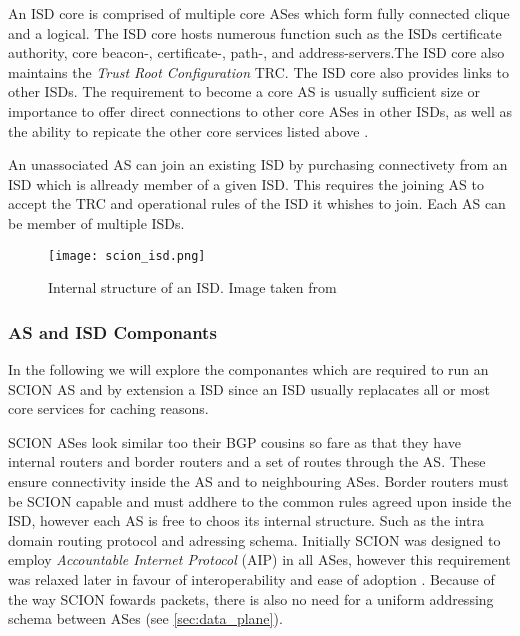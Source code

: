 \documentclass[../eva1_scion.tex]{subfiles}
\begin{document}
    An ISD core is comprised of multiple core ASes which form fully connected clique and a logical. The ISD core hosts numerous function such as the ISDs certificate authority, core beacon-, certificate-, path-, and address-servers.The ISD core also maintains the \textit{Trust Root Configuration} TRC. The ISD core also provides links to other ISDs. The requirement to become a core AS is usually sufficient size or importance to offer direct connections to other core ASes in other ISDs, as well as the ability to repicate the other core services listed above \cite{scion_2011}.

    An unassociated AS can join an existing ISD by purchasing connectivety from an ISD which is allready member of a given ISD. This requires the joining AS to accept the TRC and operational rules of the ISD it whishes to join. Each AS can be member of multiple ISDs.

    \begin{figure}[ht]
        \centering
        \texttt{[image: scion\_isd.png]}
        \caption{Internal structure of an ISD. Image taken from \cite{scion_2017}}%
        \label{fig:isd}
    \end{figure}

    \subsubsection{AS and ISD Componants}

    In the following we will explore the componantes which are required to run an SCION AS and by extension a ISD since an ISD usually replacates all or most core services for caching reasons.

    SCION ASes look similar too their BGP cousins so fare as that they have internal routers and border routers and a set of routes through the AS. These ensure connectivity inside the AS and to neighbouring ASes. Border routers must be SCION capable and must addhere to the common rules agreed upon inside the ISD, however each AS is free to choos its internal structure. Such as the intra domain routing protocol and adressing schema. Initially SCION was designed to employ \textit{Accountable Internet Protocol} (AIP) \cite{scion_2011, aip_2008} in all ASes, however this requirement was relaxed later in favour of interoperability and ease of adoption \cite{scion_2015}. Because of the way SCION fowards packets, there is also no need for a uniform addressing schema between ASes (see \ref{sec:data_plane}).
\end{document}
